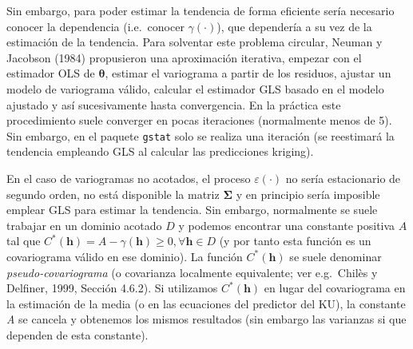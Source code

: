 \documentclass[
]{book}
\theoremstyle{break}
\theoremstyle{definition}
\theoremstyle{definition}
\theoremstyle{definition}
\theoremstyle{definition}
\theoremstyle{remark}
\begin{document}
Sin embargo, para poder estimar la tendencia de forma eficiente sería necesario conocer la dependencia (i.e.~conocer \(\gamma(\cdot)\)), que dependería a su vez de la estimación de la tendencia.
Para solventar este problema circular, Neuman y Jacobson (1984) propusieron una aproximación iterativa, empezar con el estimador OLS de \(\boldsymbol{\theta}\), estimar el variograma a partir de los residuos, ajustar un modelo de variograma válido, calcular el estimador GLS basado en el modelo ajustado y así sucesivamente hasta convergencia.
En la práctica este procedimiento suele converger en pocas iteraciones (normalmente menos de 5).
Sin embargo, en el paquete \texttt{gstat} solo se realiza una iteración (se reestimará la tendencia empleando GLS al calcular las predicciones kriging).

En el caso de variogramas no acotados, el proceso \(\varepsilon(\cdot)\) no sería estacionario de segundo orden, no está disponible la matriz \(\boldsymbol{\Sigma}\) y en principio sería imposible emplear GLS para estimar la tendencia.
Sin embargo, normalmente se suele trabajar en un dominio acotado \(D\) y podemos encontrar una constante positiva \(A\) tal que \(C^{\ast }(\mathbf{h})= A-\gamma(\mathbf{h})\geq 0,\forall \mathbf{h}\in D\) (y por tanto esta función es un covariograma válido en ese dominio).
La función \(C^{\ast }(\mathbf{h})\) se suele denominar \emph{pseudo-covariograma} (o covarianza localmente equivalente; ver e.g.~Chilès y Delfiner, 1999, Sección 4.6.2).
Si utilizamos \(C^{\ast }(\mathbf{h})\) en lugar del covariograma en la estimación de la media (o en las ecuaciones del predictor del KU), la constante \emph{A} se cancela y obtenemos los mismos resultados (sin embargo las varianzas si que dependen de esta constante).
\end{document}
